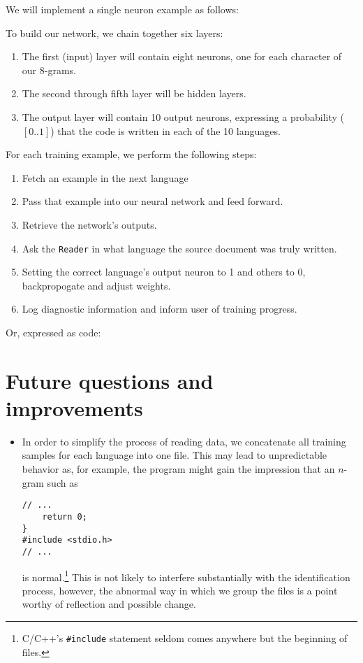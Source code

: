 \documentclass{article}
\begin{document}
We will implement a single neuron example as follows:

To build our network, we chain together six layers:
\begin{enumerate}
  \item{The first (input) layer will contain eight neurons, one for each character of our 8-grams.}
  \item{The second through fifth layer will be hidden layers.}
  \item{The output layer will contain 10 output neurons, expressing a probability ($[0..1]$) that the code is written in each of the 10 languages.}
\end{enumerate}

For each training example, we perform the following steps:
\begin{enumerate}
  \item{Fetch an example in the next language}
  \item{Pass that example into our neural network and feed forward.}
  \item{Retrieve the network's outputs.}
  \item{Ask the \texttt{Reader}  in what language the source document was truly written.}
  \item{Setting the correct language's output neuron to 1 and others to 0, backpropogate and adjust weights.}
  \item{Log diagnostic information and inform user of training progress.}
\end{enumerate}
Or, expressed as code:

\section{Future questions and improvements}
\begin{itemize}
  \item{In order to simplify the process of reading data, we concatenate all training samples for each language into one file. This may lead to unpredictable behavior as, for example, the program might gain the impression that an $n$-gram such as
  \begin{verbatim}
// ...
    return 0;
}
#include <stdio.h>
// ...
  \end{verbatim}
  is normal.\footnote{C/C++'s \texttt{\#include} statement seldom comes anywhere but the beginning of files.} This is not likely to interfere substantially with the identification process, however, the abnormal way in which we group the files is a point worthy of reflection and possible change.}
\end{itemize}
\end{document}
